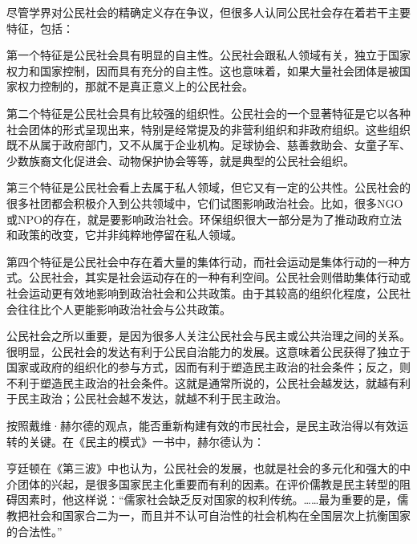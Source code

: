 {{尽管学界对公民社会的精确定义存在争议，但很多人认同公民社会存在着若干主要特征，包括：

第一个特征是公民社会具有明显的自主性。公民社会跟私人领域有关，独立于国家权力和国家控制，因而具有充分的自主性。这也意味着，如果大量社会团体是被国家权力控制的，那就不是真正意义上的公民社会。

第二个特征是公民社会具有比较强的组织性。公民社会的一个显著特征是它以各种社会团体的形式呈现出来，特别是经常提及的非营利组织和非政府组织。这些组织既不从属于政府部门，又不从属于企业机构。足球协会、慈善救助会、女童子军、少数族裔文化促进会、动物保护协会等等，就是典型的公民社会组织。

第三个特征是公民社会看上去属于私人领域，但它又有一定的公共性。公民社会的很多社团都会积极介入到公共领域中，它们试图影响政治社会。比如，很多NGO或NPO的存在，就是要影响政治社会。环保组织很大一部分是为了推动政府立法和政策的改变，它并非纯粹地停留在私人领域。

第四个特征是公民社会中存在着大量的集体行动，而社会运动是集体行动的一种方式。公民社会，其实是社会运动存在的一种有利空间。公民社会则借助集体行动或社会运动更有效地影响到政治社会和公共政策。由于其较高的组织化程度，公民社会往往比个人更能影响政治社会与公共政策。

公民社会之所以重要，是因为很多人关注公民社会与民主或公共治理之间的关系。很明显，公民社会的发达有利于公民自治能力的发展。这意味着公民获得了独立于国家或政府的组织化的参与方式，因而有利于塑造民主政治的社会条件；反之，则不利于塑造民主政治的社会条件。这就是通常所说的，公民社会越发达，就越有利于民主政治；公民社会越不发达，就越不利于民主政治。

按照戴维·赫尔德的观点，能否重新构建有效的市民社会，是民主政治得以有效运转的关键。在《民主的模式》一书中，赫尔德认为：


亨廷顿在《第三波》中也认为，公民社会的发展，也就是社会的多元化和强大的中介团体的兴起，是很多国家民主化重要而有利的因素。在评价儒教是民主转型的阻碍因素时，他这样说：“儒家社会缺乏反对国家的权利传统。……最为重要的是，儒教把社会和国家合二为一，而且并不认可自治性的社会机构在全国层次上抗衡国家的合法性。”

}}
